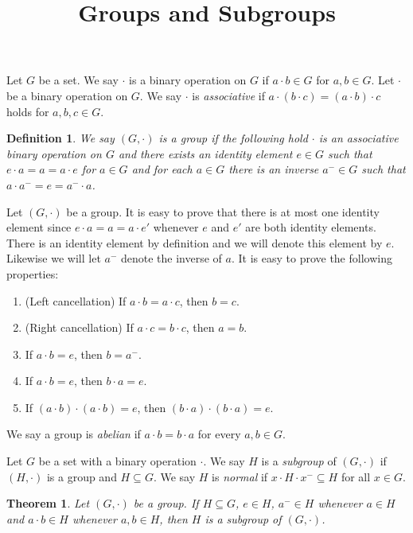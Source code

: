 \documentclass{article}
\title{Groups and Subgroups}
\newtheorem{theorem}{Theorem}
\newtheorem{definition}{Definition}
\begin{document}
\maketitle

Let $G$ be a set.
We say $\cdot$ is a binary operation on $G$
if $a\cdot b\in G$ for $a,b\in G$.
Let $\cdot$ be a binary operation on $G$.
We say $\cdot$ is {\emph{associative}} if $a\cdot (b\cdot c) = (a\cdot b) \cdot c$
holds for $a,b,c\in G$.
\begin{definition}\label{def:group}
  We say $(G,\cdot)$ is a {\emph{group}} if the following hold
  $\cdot$ is an associative binary operation on $G$ 
  and there exists an identity element $e\in G$ such
  that $e\cdot a = a = a\cdot e$ for $a\in G$
  and for each $a\in G$ there is an inverse $a^-\in G$ such that
  $a\cdot a^- = e = a^-\cdot a$.
\end{definition}

Let $(G,\cdot)$ be a group.
It is easy to prove that there is at most one identity element
since $e\cdot a = a = a \cdot e'$ whenever $e$ and $e'$ are both identity elements.
There is an identity element by definition and we will denote this element by $e$.
Likewise we will let $a^-$ denote the inverse of $a$.
It is easy to prove the following properties:
\begin{enumerate}
\item (Left cancellation) If $a\cdot b = a \cdot c$, then $b = c$.
\item (Right cancellation) If $a\cdot c = b \cdot c$, then $a = b$.
\item If $a\cdot b = e$, then $b = a^-$.
\item If $a\cdot b = e$, then $b\cdot a = e$.
\item If $(a\cdot b) \cdot (a\cdot b) = e$, then $(b\cdot a) \cdot (b\cdot a) = e$.
\end{enumerate}
We say a group is {\emph{abelian}} if $a\cdot b = b \cdot a$ for every $a,b\in G$.

Let $G$ be a set with a binary operation $\cdot$.
We say $H$ is a {\emph{subgroup}} of $(G,\cdot)$ if $(H,\cdot)$ is a group and $H\subseteq G$.
We say $H$ is {\emph{normal}} if $x\cdot H\cdot x^- \subseteq H$ for all $x\in G$.

\begin{theorem}\label{thm:subgrouptest}
  Let $(G,\cdot)$ be a group.
  If $H\subseteq G$, $e\in H$, $a^-\in H$ whenever $a\in H$ and $a\cdot b \in H$ whenever $a,b\in H$,
  then $H$ is a subgroup of $(G,\cdot)$.
\end{theorem}
\end{document}
